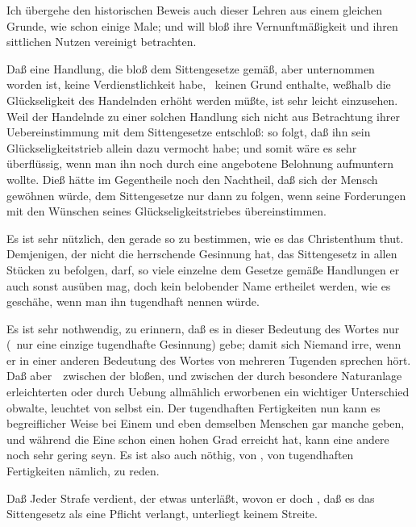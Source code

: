 Ich übergehe den historischen Beweis auch dieser Lehren aus einem gleichen Grunde, wie schon einige Male; und will bloß ihre Vernunftmäßigkeit und ihren sittlichen Nutzen vereinigt betrachten.
\begin{aufza}
\item Daß eine Handlung, die bloß dem Sittengesetze gemäß, aber  unternommen worden ist, keine Verdienstlichkeit habe, \dh\  keinen Grund enthalte, weßhalb die Glückseligkeit des Handelnden erhöht werden müßte, ist sehr leicht einzusehen. Weil der Handelnde zu einer solchen Handlung sich nicht aus Betrachtung ihrer Uebereinstimmung mit dem Sittengesetze entschloß: so folgt, daß ihn sein Glückseligkeitstrieb allein dazu vermocht habe; und somit wäre es sehr überflüssig, wenn man ihn noch durch eine angebotene Belohnung aufmuntern wollte. Dieß hätte im Gegentheile noch den Nachtheil, daß sich der Mensch gewöhnen würde, dem Sittengesetze nur dann zu folgen, wenn seine Forderungen mit den Wünschen seines Glückseligkeitstriebes übereinstimmen.
\item Es ist sehr nützlich, den  gerade so zu bestimmen, wie es das Christenthum thut. Demjenigen, der nicht die herrschende Gesinnung hat, das Sittengesetz in allen Stücken zu befolgen, darf, so viele einzelne dem Gesetze gemäße Handlungen er auch sonst ausüben mag, doch kein belobender Name ertheilet werden, wie es geschähe, wenn man ihn tugendhaft nennen würde.
\item Es ist sehr nothwendig, zu erinnern, daß es in dieser Bedeutung des Wortes nur  (\di\ nur eine einzige tugendhafte Gesinnung) gebe; damit sich Niemand irre, wenn er in einer anderen Bedeutung des Wortes von mehreren Tugenden sprechen hört. Daß aber~\ zwischen der bloßen, und zwischen der durch besondere Naturanlage erleichterten oder durch Uebung allmählich erworbenen  ein wichtiger Unterschied obwalte, leuchtet von selbst ein. Der tugendhaften Fertigkeiten nun kann es begreiflicher Weise bei Einem und eben demselben Menschen gar manche geben, und während die Eine schon einen hohen Grad erreicht hat, kann eine andere noch sehr gering seyn. Es ist also auch nöthig, von , von tugendhaften Fertigkeiten nämlich, zu reden.
\item Daß Jeder Strafe verdient, der etwas unterläßt, wovon er doch , daß es das Sittengesetz als eine Pflicht verlangt, unterliegt keinem Streite.

\end{aufza}
